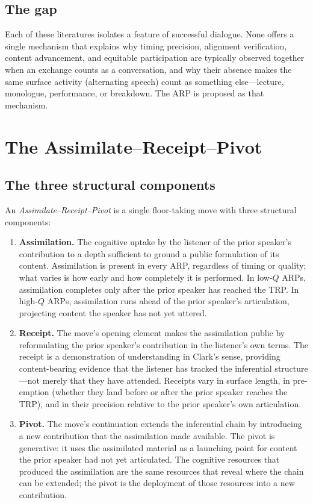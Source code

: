\subsection{The gap}

Each of these literatures isolates a feature of successful dialogue. None offers a single mechanism that explains why timing precision, alignment verification, content advancement, and equitable participation are typically observed together when an exchange counts as a conversation, and why their absence makes the same surface activity (alternating speech) count as something else---lecture, monologue, performance, or breakdown. The ARP is proposed as that mechanism.

\section{The Assimilate--Receipt--Pivot}\label{sec:construct}

\subsection{The three structural components}

An \emph{Assimilate--Receipt--Pivot} is a single floor-taking move with three structural components:

\begin{enumerate}[leftmargin=2em,label=\arabic*.]
  \item \textbf{Assimilation.} The cognitive uptake by the listener of the prior speaker's contribution to a depth sufficient to ground a public formulation of its content. Assimilation is present in every ARP, regardless of timing or quality; what varies is how early and how completely it is performed. In low-$Q$ ARPs, assimilation completes only after the prior speaker has reached the TRP. In high-$Q$ ARPs, assimilation runs ahead of the prior speaker's articulation, projecting content the speaker has not yet uttered.
  \item \textbf{Receipt.} The move's opening element makes the assimilation public by reformulating the prior speaker's contribution in the listener's own terms. The receipt is a demonstration of understanding in Clark's sense, providing content-bearing evidence that the listener has tracked the inferential structure---not merely that they have attended. Receipts vary in surface length, in pre-emption (whether they land before or after the prior speaker reaches the TRP), and in their precision relative to the prior speaker's own articulation.
  \item \textbf{Pivot.} The move's continuation extends the inferential chain by introducing a new contribution that the assimilation made available. The pivot is generative: it uses the assimilated material as a launching point for content the prior speaker had not yet articulated. The cognitive resources that produced the assimilation are the same resources that reveal where the chain can be extended; the pivot is the deployment of those resources into a new contribution.
\end{enumerate}

